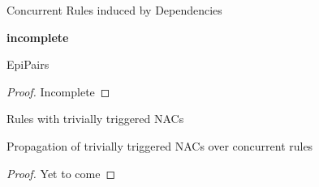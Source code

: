\begin{mydef}{Concurrent Rules induced by Dependencies}

  \textbf{incomplete}

\centerline{
}

\end{mydef}

\begin{thm}{EpiPairs}
  \begin{proof}{Incomplete}
  \end{proof}
\end{thm}


\begin{mydef}{Rules with trivially triggered NACs}
\end{mydef}

\begin{thm}{Propagation of trivially triggered NACs over concurrent rules}
  \begin{proof}{Yet to come}
  \end{proof}
\end{thm}


